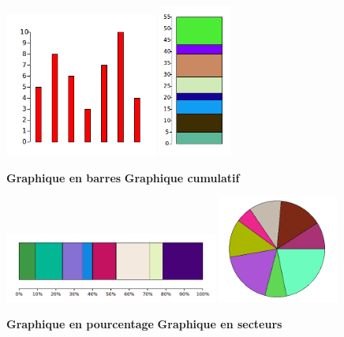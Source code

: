 \documentclass[11pt,class=report,crop=false]{standalone}
\begin{document}
\begin{activite}[Graphiques]


\begin{center}
\includegraphics[scale=\myscale,width=5cm]{ecran-stat-2a}\qquad\qquad
\includegraphics[scale=\myscale,height=5cm]{ecran-stat-2b}

\qquad\qquad\textbf{Graphique en barres}\qquad\qquad\quad
\textbf{Graphique cumulatif}
\end{center}

\begin{center}
\includegraphics[scale=\myscale,width=7cm]{ecran-stat-2c}\qquad\qquad
\includegraphics[scale=\myscale,width=4cm]{ecran-stat-2d}

\qquad\qquad\textbf{Graphique en pourcentage}\qquad\qquad\qquad
\textbf{Graphique en secteurs}
\end{center}


\end{activite}
\end{document}
